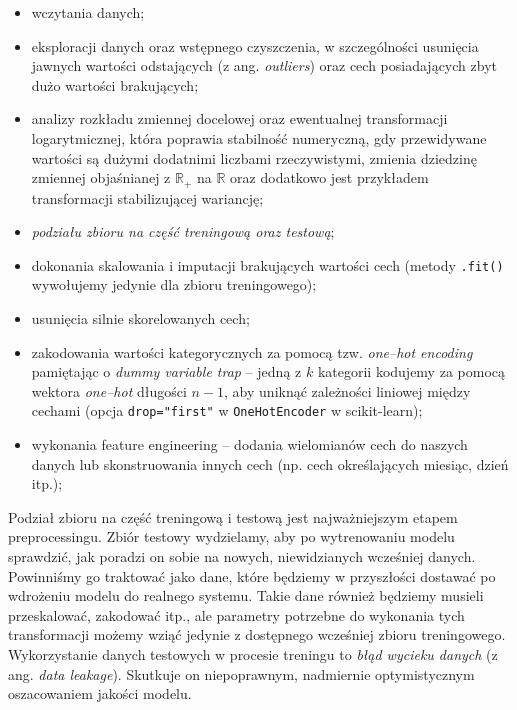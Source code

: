 \documentclass{myclass}
\numberwithin{equation}{subsection}
\begin{document}
\begin{itemize}
    \item wczytania danych;
    
    \item eksploracji danych oraz wstępnego czyszczenia, w szczególności usunięcia jawnych wartości
    odstających (z ang. \textit{outliers}) oraz cech posiadających zbyt dużo wartości brakujących;

    \item analizy rozkładu zmiennej docelowej oraz ewentualnej transformacji logarytmicznej, która
    poprawia stabilność numeryczną, gdy przewidywane wartości są dużymi dodatnimi liczbami
    rzeczywistymi, zmienia dziedzinę zmiennej objaśnianej z \(\mathbb{R}_+\) na \(\mathbb{R}\) oraz
    dodatkowo jest przykładem transformacji stabilizującej wariancję;
    
    \item \emph{podziału zbioru na część treningową oraz testową};

    \item dokonania skalowania i imputacji brakujących wartości cech (metody \texttt{.fit()}
    wywołujemy jedynie dla zbioru treningowego);

    \item usunięcia silnie skorelowanych cech;

    \item zakodowania wartości kategorycznych za pomocą tzw. \textit{one--hot encoding} pamiętając o
    \textit{dummy variable trap} -- jedną z \(k\) kategorii kodujemy za pomocą wektora
    \textit{one--hot} długości \(n-1\), aby uniknąć zależności liniowej między cechami (opcja
    \texttt{drop="first"} w \texttt{OneHotEncoder} w scikit-learn);

    \item wykonania feature engineering -- dodania wielomianów cech do naszych danych lub
    skonstruowania innych cech (np. cech określających miesiąc, dzień itp.);
\end{itemize}

Podział zbioru na część treningową i testową jest najważniejszym etapem preprocessingu. Zbiór
testowy wydzielamy, aby po wytrenowaniu modelu sprawdzić, jak poradzi on sobie na nowych,
niewidzianych wcześniej danych. Powinniśmy go traktować jako dane, które będziemy w przyszłości
dostawać po wdrożeniu modelu do realnego systemu. Takie dane również będziemy musieli przeskalować,
zakodować itp., ale parametry potrzebne do wykonania tych transformacji możemy wziąć jedynie z
dostępnego wcześniej zbioru treningowego. Wykorzystanie danych testowych w procesie treningu to
\emph{błąd wycieku danych} (z ang. \textit{data leakage}). Skutkuje on niepoprawnym, nadmiernie
optymistycznym oszacowaniem jakości modelu.
\end{document}
